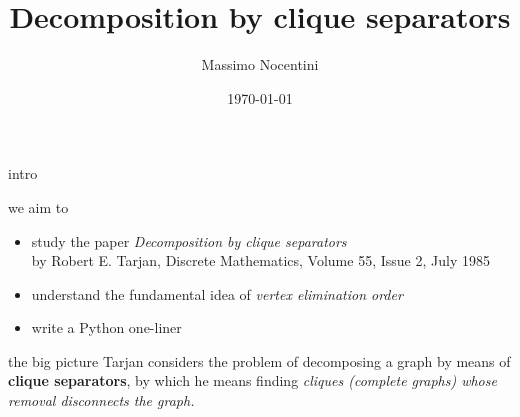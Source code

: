 \documentclass{beamer}
\title{Decomposition by clique separators}
\author[Merlini, Nocentini] %
{Massimo Nocentini}
\institute
{
  Dipartimento di Statistica, Informatica, Applicazioni \\
  University of Florence, Italy
}
\date[Short Occasion] %
{\today}
\begin{document}
\begin{frame}
  \titlepage
\end{frame}

\iffalse
\begin{frame}{Outline}
  \tableofcontents
\end{frame}
\fi





\begin{frame}{intro}

\begin{block}{we aim to}
\begin{itemize}
    \item study the paper \textit{Decomposition by clique
    separators}\\{\footnotesize by Robert E. Tarjan, Discrete Mathematics, Volume 55,
    Issue 2, July 1985}
    \item understand the fundamental idea of \textit{vertex elimination order}
    \item write a Python one-liner
\end{itemize}
\end{block}

\begin{block}{the big picture}
Tarjan considers the problem of decomposing a graph by means of \textbf{clique
separators}, by which he means finding \textit{cliques (complete graphs) whose removal
disconnects the graph.} 
\end{block}

\end{frame}
\end{document}
